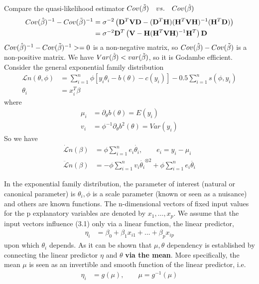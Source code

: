 \documentclass{article}
\begin{document}
Compare the quasi-likelihood estimator $ Cov( \Tilde{\beta}) \quad vs. \quad Cov( \hat{\beta})$
\begin{align*}
 Cov( \hat{\beta})^{-1} - Cov( \Tilde{\beta})^{-1} &= \sigma^{-2} \left(\mathbf{D}^T \mathbf{V} \mathbf{D} - (\mathbf{D}^T \mathbf{H})  (\mathbf{H}^T \mathbf{V} \mathbf{H}) ^{-1} (\mathbf{H}^T\mathbf{D}) \right)\\
 &=\sigma^{-2} \mathbf{D}^T \left( \mathbf{V} - \mathbf{H} (\mathbf{H}^T \mathbf{V} \mathbf{H}) ^{-1} \mathbf{H}^T \right)   \mathbf{D}
\end{align*} 
$ Cov( \hat{\beta})^{-1} - Cov( \Tilde{\beta})^{-1} >= 0$ is a non-negative matrix, so $ Cov( \hat{\beta}) - Cov( \Tilde{\beta})$ is a non-positive matrix. We have $Var(\hat{\beta}) < var(\Tilde{\beta})$, so it is Godambe efficient.
 Consider the general exponential family distribution
\begin{align}
    \mathcal{L}n (\theta, \phi) &= \sum_{i=1}^n \phi  \left[ y_{i}\theta_i - b(\theta) - c(y_i)\right] - 0.5 \sum_{i=1}^n s(\phi,y_i)\\
    \theta_i &= x_i^T \beta
\end{align}
 where   
\begin{align*}
    \mu_i&= \partial_{\theta}b(\theta) = E(y_i)\\
    v_i &= \phi^{-1} \partial_{\theta} b^2(\theta) = Var(y_i)
\end{align*}
So we have
\begin{align*}
    \dot{\mathcal{L}}n (\beta) &= \phi \sum_{i=1}^n  e_{i} \dot{\theta_i}, \qquad e_i= y_i-\mu_i\\
    \ddot{\mathcal{L}}n (\beta) &= -\phi \sum_{i=1}^n  v_{i} \dot{\theta_i}^{\otimes 2} + \phi \sum_{i=1}^n  e_{i} \ddot{\theta_i}
\end{align*}

In the exponential family distribution, the parameter of interest (natural or canonical parameter) is $\theta_i, \phi$  is a scale parameter (known or seen as a nuisance) and others are known functions. The n-dimensional vectors of fixed input values for the p explanatory variables are denoted by $x_1,…,x_p$. We assume that the input vectors influence (3.1) only via a linear function, the linear predictor,
\begin{align}
    \eta_i &= \beta_0 + \beta_1x_{i1} + ... + \beta_px_{ip}
\end{align}
upon which $\theta_i$ depends. As it can be shown that $\mu, \theta$ dependency is established by connecting the linear predictor $\eta$ and $\theta$ \textbf{ via the mean}. More specifically, the mean $\mu$ is seen as an invertible and smooth function of the linear predictor, i.e.
\begin{align}
    \eta_i &= g(\mu), \qquad \mu= g^{-1}(\mu)
\end{align}
\end{document}
